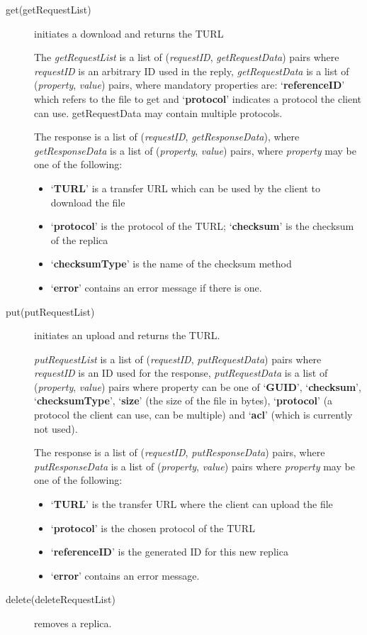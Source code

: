 \documentclass{book}
\begin{document}
\begin{description}
    
    \item[get(getRequestList)] initiates a download and returns the TURL
    
    The \emph{getRequestList} is a list of (\emph{requestID}, \emph{getRequestData}) pairs where \emph{requestID} is an arbitrary ID used in the reply, \emph{getRequestData} is a list of (\emph{property}, \emph{value}) pairs, where mandatory properties are: `\textbf{referenceID}' which refers to the file to get and `\textbf{protocol}' indicates a protocol the client can use. getRequestData may contain multiple protocols.
    
    The response is a list of (\emph{requestID}, \emph{getResponseData}), where \emph{getResponseData} is a list of (\emph{property}, \emph{value}) pairs, where \emph{property} may be one of the following: 
    \begin{itemize}
      \item `\textbf{TURL}' is a transfer URL which can be used by the client to download the file
      \item `\textbf{protocol}' is the protocol of the TURL; `\textbf{checksum}' is the checksum of the replica
      \item `\textbf{checksumType}' is the name of the checksum method
      \item `\textbf{error}' contains an error message if there is one.
    \end{itemize}
    \item[put(putRequestList)] initiates an upload and returns the TURL.
        
    \emph{putRequestList} is a list of (\emph{requestID}, \emph{putRequestData}) pairs where \emph{requestID} is an ID used for the response,     \emph{putRequestData} is a list of (\emph{property}, \emph{value}) pairs where property can be one of `\textbf{GUID}', `\textbf{checksum}', `\textbf{checksumType}', `\textbf{size}' (the size of the file in bytes), `\textbf{protocol}' (a protocol the client can use, can be multiple) and `\textbf{acl}' (which is currently not used).
    
    The response is a list of (\emph{requestID}, \emph{putResponseData}) pairs, where \emph{putResponseData} is a list of (\emph{property}, \emph{value}) pairs where \emph{property} may be one of the following:
    \begin{itemize}
      \item `\textbf{TURL}' is the transfer URL where the client can upload the file
      \item `\textbf{protocol}' is the chosen protocol of the TURL
      \item `\textbf{referenceID}' is the generated ID for this new replica
      \item `\textbf{error}' contains an error message.
    \end{itemize}
    \item[delete(deleteRequestList)] removes a replica.
    

\end{description}
\end{document}
